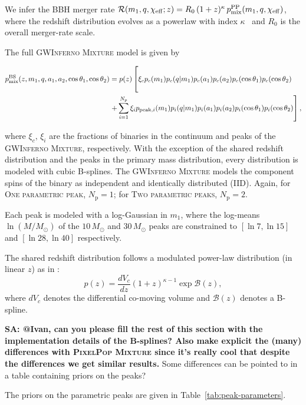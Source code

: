 \documentclass[twocolumn,twocolappendix,linenumbers]{aastex631}
\newcommand{\sa}[1]{{\bf\color{Thistle}SA: #1}}
\renewcommand{\ij}[1]{{\color{Green} #1}}
\newcommand{\PPMixture}{\textsc{PixelPop Mixture}\xspace}
\newcommand{\GwinfMixture}{\textsc{GWInferno Mixture}\xspace}
\newcommand{\oneparpeak}{\textsc{One parametric peak}\xspace}
\newcommand{\twoparpeaks}{\textsc{Two parametric peaks}\xspace}
\newcommand{\chieff}{\ensuremath{\chi_\mathrm{eff}}\xspace}
\begin{document}
We infer the \ac{BBH} merger rate $\mathcal{R}(m_1,q,\chieff;z)
= R_0\,(1+z)^\kappa\, p_{\rm mix}^{\rm PP}(m_1,q,\chieff)$, where the redshift distribution evolves as a powerlaw with index $\kappa$~\citep{Fishbach:2018edt} and $R_0$ is the overall merger-rate scale.

The full \GwinfMixture model is given by
\begin{widetext}
\begin{equation}\label{eq:bspline-mixture}
\begin{aligned}
    p_\mathrm{mix}^\mathrm{BS}(z,m_1,q,a_1,a_2,\cos\theta_1,\cos\theta_2)&=p(z)\left[\xi_cp_c(m_1)p_c(q|m_1)p_c(a_1)p_c(a_2)p_c(\cos\theta_1)p_c(\cos\theta_2)\vphantom{\sum_{i=1}^{N_p}}\right. \\
    &\left.+\sum_{i=1}^{N_p}\xi_ip_{\mathrm{peak},i}(m_1)p_i(q|m_1)p_i(a_1)p_i(a_2)p_i(\cos\theta_1)p_i(\cos\theta_2)\right],
\end{aligned}
\end{equation}
\end{widetext}
where \(\xi_c,\,\xi_i\) are the fractions of binaries in the continuum and peaks of the \GwinfMixture, respectively.
With the exception of the shared redshift distribution and the peaks in the primary mass distribution, every distribution is modeled with cubic B-splines.
The \GwinfMixture models the component spins of the binary as independent and identically distributed (IID).
\ij{Again}, for \oneparpeak, \(N_\mathrm{p}=1\); for \twoparpeaks, \(N_\mathrm{p}=2\).

Each peak is modeled with a log-Gaussian in \(m_1\), where the log-means \(\ln(M/M_\odot)\) of the \(10\,M_\odot\) and \(30\,M_\odot\) peaks are constrained to \([\ln7,\ln15]\) and \([\ln28,\ln40]\) respectively.

The shared redshift distribution follows a modulated power-law distribution (in linear \(z\)) as in \cite{Edelman:2022ydv}:
\[
p(z)=\frac{dV_c}{dz}(1+z)^{\kappa-1}\exp\mathcal{B}(z),
\]
where \(dV_c\) denotes the differential co-moving volume and \(\mathcal{B}(z)\) denotes a B-spline.

\sa{@Ivan, can you please fill the rest of this section with the implementation details of the B-splines? Also make explicit the (many) differences with \PPMixture since it's really cool that despite the differences we get similar results.} 
\ij{Some differences can be pointed to in a table containing priors on the peaks?}


The priors on the parametric peaks are given in Table~\ref{tab:peak-parameters}.
\end{document}
